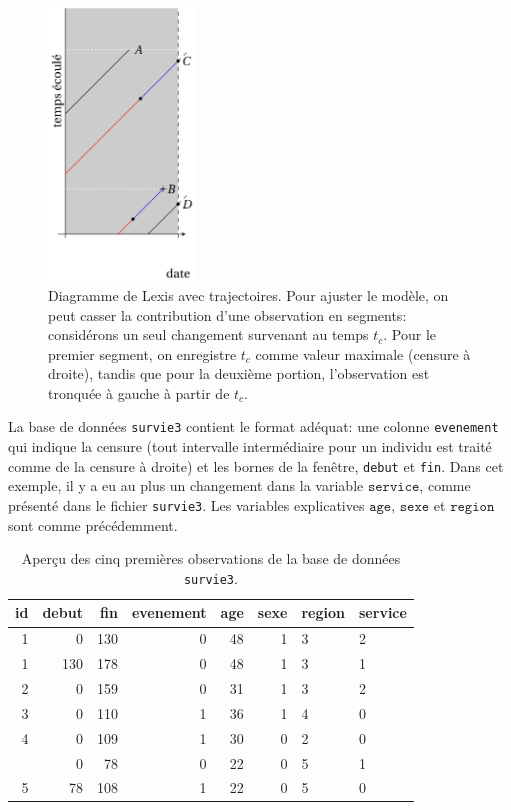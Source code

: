 \documentclass[
  11pt,
  letterpaper,
]{scrbook}
\theoremstyle{definition}
\theoremstyle{remark}
\begin{document}
\begin{figure}[ht!]

{\centering \includegraphics[width=0.35\textwidth,height=\textheight]{figures/Lexis_censure_modif.png}

}

\caption{\label{fig-lexischtemps}Diagramme de Lexis avec trajectoires.
Pour ajuster le modèle, on peut casser la contribution d'une observation
en segments: considérons un seul changement survenant au temps \(t_c\).
Pour le premier segment, on enregistre \(t_c\) comme valeur maximale
(censure à droite), tandis que pour la deuxième portion, l'observation
est tronquée à gauche à partir de \(t_c\).}

\end{figure}

La base de données \texttt{survie3} contient le format adéquat: une
colonne \texttt{evenement} qui indique la censure (tout intervalle
intermédiaire pour un individu est traité comme de la censure à droite)
et les bornes de la fenêtre, \texttt{debut} et \texttt{fin}. Dans cet
exemple, il y a eu au plus un changement dans la variable
\(\texttt{service}\), comme présenté dans le fichier \texttt{survie3}.
Les variables explicatives \(\texttt{age}\), \(\texttt{sexe}\) et
\(\texttt{region}\) sont comme précédemment.

\hypertarget{tbl-survie3-donnees}{}
\begin{table}
\caption{\label{tbl-survie3-donnees}Aperçu des cinq premières observations de la base de données
\texttt{survie3}. }\tabularnewline

\centering
\begin{tabular}{rrrrrrll}
\toprule
id & debut & fin & evenement & age & sexe & region & service\\
\midrule
1 & 0 & 130 & 0 & 48 & 1 & 3 & 2\\
1 & 130 & 178 & 0 & 48 & 1 & 3 & 1\\
2 & 0 & 159 & 0 & 31 & 1 & 3 & 2\\
3 & 0 & 110 & 1 & 36 & 1 & 4 & 0\\
4 & 0 & 109 & 1 & 30 & 0 & 2 & 0\\
\addlinespace
5 & 0 & 78 & 0 & 22 & 0 & 5 & 1\\
5 & 78 & 108 & 1 & 22 & 0 & 5 & 0\\
\bottomrule
\end{tabular}
\end{table}
\end{document}
